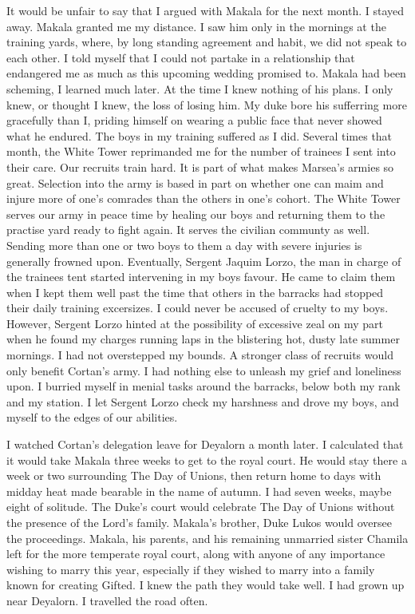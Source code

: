 \documentclass{article}
\begin{document}
It would be unfair to say that I argued with Makala for the next month. I stayed away. Makala granted me my distance. I saw him only in the mornings at the training yards, where, by long standing agreement and habit, we did not speak to each other. I told myself that I could not partake in a relationship that endangered me as much as this upcoming wedding promised to. Makala had been scheming, I learned much later. At the time I knew nothing of his plans. I only knew, or thought I knew, the loss of losing him. My duke bore his sufferring more gracefully than I, priding himself on wearing a public face that never showed what he endured. The boys in my training suffered as I did. Several times that month, the White Tower reprimanded me for the number of trainees I sent into their care. Our recruits train hard. It is part of what makes Marsea's armies so great. Selection into the army is based in part on whether one can maim and injure more of one's comrades than the others in one's cohort. The White Tower serves our army in peace time by healing our boys and returning them to the practise yard ready to fight again. It serves the civilian communty as well. Sending more than one or two boys to them a day with severe injuries is generally frowned upon. Eventually, Sergent Jaquim Lorzo, the man in charge of the trainees tent started intervening in my boys favour. He came to claim them when I kept them well past the time that others in the barracks had stopped their daily training excersizes. I could never be accused of cruelty to my boys. However, Sergent Lorzo hinted at the possibility of excessive zeal on my part when he found my charges running laps in the blistering hot, dusty late summer mornings. I had not overstepped my bounds. A stronger class of recruits would only benefit Cortan's army. I had nothing else to unleash my grief and loneliness upon. I burried myself in menial tasks around the barracks, below both my rank and my station. I let Sergent Lorzo check my harshness and drove my boys, and myself to the edges of our abilities. 

I watched Cortan's delegation leave for Deyalorn a month later. I calculated that it would take Makala three weeks to get to the royal court. He would stay there a week or two surrounding The Day of Unions, then return home to days with midday heat made bearable in the name of autumn. I had seven weeks, maybe eight of solitude. The Duke's court would celebrate The Day of Unions without the presence of the Lord's family. Makala's brother, Duke Lukos would oversee the proceedings. Makala, his parents, and his remaining unmarried sister Chamila left for the more temperate royal court,  along with anyone of any importance wishing to marry this year, especially if they wished to marry into a family known for creating Gifted. I knew the path they would take well. I had grown up near Deyalorn. I travelled the road often. 
\end{document}
